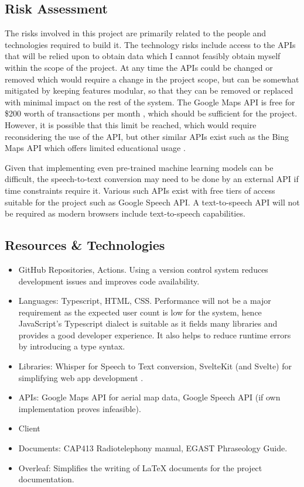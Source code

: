 \subsection{Risk Assessment}
The risks involved in this project are primarily related to the people and technologies required to build it.
The technology risks include access to the APIs that will be relied upon to obtain data which I cannot feasibly obtain myself within the scope of the project.
At any time the APIs could be changed or removed which would require a change in the project scope, but can be somewhat mitigated by keeping features modular, so that they can be removed or replaced with minimal impact on the rest of the system.
The Google Maps API is free for \$200 worth of transactions per month \cite{GoogleMapsLicensing}, which should be sufficient for the project. However, it is possible that this limit be reached, which would require reconsidering the use of the API, but other similar APIs exist such as the Bing Maps API which offers limited educational usage \cite{BingMapsLicensing}.

Given that implementing even pre-trained machine learning models can be difficult, the speech-to-text conversion may need to be done by an external API if time constraints require it. Various such APIs exist with free tiers of access suitable for the project such as Google Speech API. A text-to-speech API will not be required as modern browsers include text-to-speech capabilities.

\subsection{Resources \& Technologies}
\label{resourcestechnologies}
\begin{itemize}
    \item GitHub Repositories, Actions. Using a version control system reduces development issues and improves code availability.
    \item Languages: Typescript, HTML, CSS. Performance will not be a major requirement as the expected user count is low for the system, hence JavaScript's Typescript dialect is suitable as it fields many libraries and provides a good developer experience. It also helps to reduce runtime errors by introducing a type syntax.
    \item Libraries: Whisper for Speech to Text conversion, SvelteKit (and Svelte) for simplifying web app development \cite{SvelteKit}\cite{Svelte}.
    \item APIs: Google Maps API for aerial map data, Google Speech API (if own implementation proves infeasible).
    \item Client
    \item Documents: CAP413 Radiotelephony manual, EGAST Phraseology Guide.
    \item Overleaf: Simplifies the writing of LaTeX documents for the project documentation.
\end{itemize}

